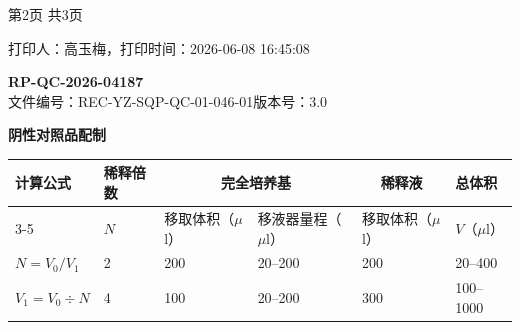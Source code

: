 \documentclass[UTF8,10pt,a4paper,fontset=fandol]{ctexart}
\newcommand{\fieldvalue}[1]{#1}
\newcommand{\handwritten}[1]{#1}
\begin{document}
\begin{center}
第2页 共3页
\end{center}

\begin{center}
打印人：高玉梅，打印时间：2026-06-08 16:45:08
\end{center}


\newpage

\begin{center}
\textbf{RP-QC-2026-04187}\\
文件编号：REC-YZ-SQP-QC-01-046-01\quad 版本号：3.0
\end{center}

\begin{center}
\small
\textbf{阴性对照品配制}
\begin{tabular}{|p{2.2cm}|p{1.0cm}|p{2.2cm}|p{2.2cm}|p{2.2cm}|p{1.5cm}|}
\hline
计算公式 & 稀释倍数 & \multicolumn{2}{c|}{完全培养基} & \multicolumn{1}{c|}{稀释液} & 总体积\\
\cline{3-5}
& $N$ & 移取体积（$\mu$l） & 移液器量程（$\mu$l） & 移取体积（$\mu$l） & $V$（$\mu$l）\\
\hline
$N=V_0/V_1$ & 
\fieldvalue{\handwritten{2}} &
\fieldvalue{\handwritten{200}} &
\fieldvalue{\handwritten{20--200}} &
\fieldvalue{\handwritten{200}} &
\fieldvalue{\handwritten{20--400}}\\
\hline
$V_1=V_0\div N$ &
\fieldvalue{\handwritten{4}} &
\fieldvalue{\handwritten{100}} &
\fieldvalue{\handwritten{20--200}} &
\fieldvalue{\handwritten{300}} &
\fieldvalue{\handwritten{100--1000}}\\
\hline
\end{tabular}


\end{center}
\end{document}
